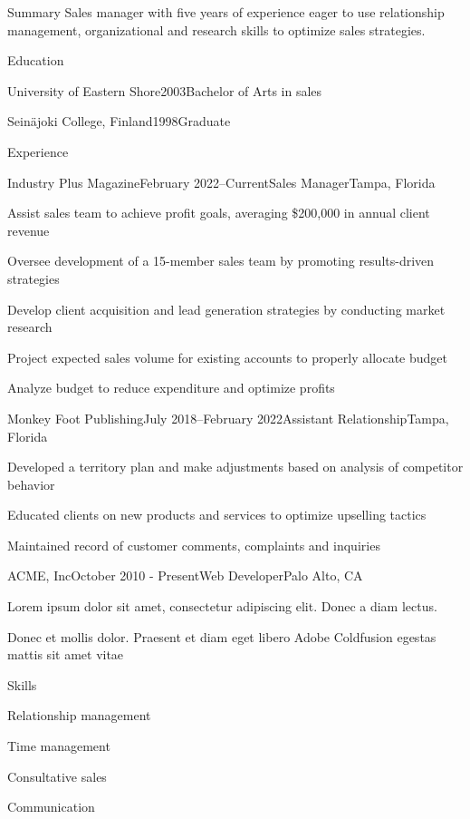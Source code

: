 \documentclass[a4paper, 11pt]{resume}
\begin{document}
  \begin{rSection}{Summary}
  Sales manager with five years of experience eager to use relationship
management, organizational and research skills to optimize sales
strategies. 
  \end{rSection}

  \begin{rSection}{Education}
        \begin{eSubsection}{University of Eastern Shore}{2003}{Bachelor
of Arts in sales}{}
     \end{eSubsection}
        \begin{eSubsection}{Seinäjoki College,
Finland}{1998}{Graduate}{}
     \end{eSubsection}
      \end{rSection}
  
  
  \begin{rSection}{Experience}
        \begin{rSubsection}{Industry Plus Magazine}{February
2022--Current}{Sales Manager}{Tampa, Florida}
        \item Assist sales team to achieve profit goals, averaging
\$200,000 in annual client revenue
        \item Oversee development of a 15-member sales team by promoting
results-driven strategies
        \item Develop client acquisition and lead generation strategies
by conducting market research
        \item Project expected sales volume for existing accounts to
properly allocate budget
        \item Analyze budget to reduce expenditure and optimize profits
        \end{rSubsection}
        \begin{rSubsection}{Monkey Foot Publishing}{July 2018--February
2022}{Assistant Relationship}{Tampa, Florida}
        \item Developed a territory plan and make adjustments based on
analysis of competitor behavior
        \item Educated clients on new products and services to optimize
upselling tactics
        \item Maintained record of customer comments, complaints and
inquiries
        \end{rSubsection}
        
    \begin{rSubsection}{ACME, Inc}{October 2010 - Present}{Web Developer}{Palo Alto, CA}
    \item Lorem ipsum dolor sit amet, consectetur adipiscing elit. Donec a diam lectus.
    \item Donec et mollis dolor. Praesent et diam eget libero Adobe Coldfusion egestas mattis sit amet vitae 
    \end{rSubsection}
  \end{rSection}
  
  \begin{rSection}{Skills}
    \begin{lSubsection}
        \item Relationship management
        \item Time management
        \item Consultative sales
        \item Communication
        \end{lSubsection}
  \end{rSection}
\end{document}
